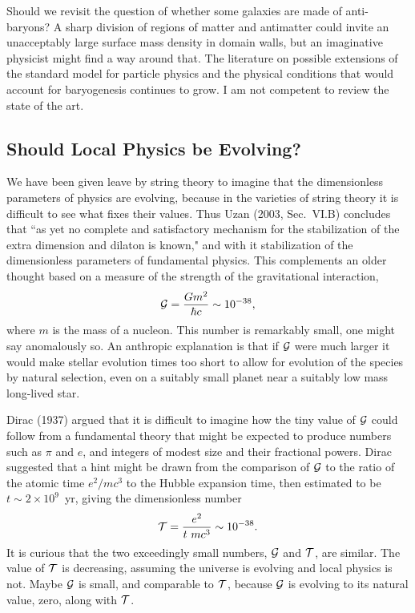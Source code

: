 \documentclass[fleqn,usenatbib]{mnras}
\newcommand{\beq}{\begin{equation}}
\newcommand{\eeq}{\end{equation}}
\begin{document}
Should we revisit the question of whether some galaxies are made of anti-baryons? A sharp division of regions of matter and antimatter could invite an unacceptably large surface mass density in domain walls, but an imaginative physicist might find a way around that. The literature on possible extensions of the standard model for particle physics and the physical conditions that would account for baryogenesis continues to grow. I am not competent to review the state of the art.

\subsection{Should Local Physics be Evolving?}\label{sec:EvolutionPhysics} 

We have been given leave by string theory to imagine that the dimensionless parameters of physics are evolving, because in the varieties of string theory it is difficult to see what fixes their values. Thus Uzan (2003, Sec.~VI.B) concludes that ``as yet no complete and satisfactory mechanism for the stabilization of the extra dimension and dilaton is known," and with it stabilization of the dimensionless parameters of fundamental physics. This complements an older thought based on a measure of the strength of the gravitational interaction, 
\beq
{\cal G} = {Gm^2\over \hbar c}\sim 10^{-38}, \label{gravitystrength}
\eeq
where $m$ is the mass of a nucleon. This number is remarkably small, one might say anomalously so. An anthropic explanation is that if ${\cal G}$ were much larger it would make stellar evolution times too short to allow for evolution of the species by natural selection, even on a suitably small planet near a suitably low mass long-lived star. 

Dirac (1937) argued that it is difficult to imagine how the tiny value of ${\cal G}$ could follow from a fundamental theory that might be expected to produce numbers such as $\pi$ and $e$, and integers of modest size and their fractional powers. Dirac suggested that a hint might be drawn from the comparison of ${\cal G}$ to the ratio of the atomic time $e^2/mc^3$ to the Hubble expansion time, then estimated to be $t \sim 2\times 10^9$~yr, giving the dimensionless number
\beq
{\cal T} = {e^2\over t~mc^3} \sim 10^{-38}. \label{atomictime}
\eeq
It is curious that the two exceedingly small numbers, ${\cal G}$ and ${\cal T}$, are similar. The value of ${\cal T}$ is decreasing, assuming the universe is evolving and local physics is not. Maybe ${\cal G}$ is small, and comparable to ${\cal T}$, because ${\cal G}$ is evolving to its natural value, zero, along with ${\cal T}$. 
\end{document}
